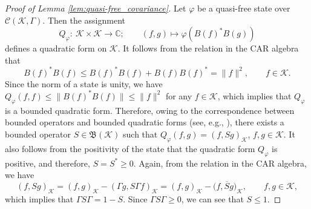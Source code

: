 \documentclass[11pt]{article}
\numberwithin{equation}{section}
\numberwithin{equation}{section}
\newcommand{\mfrak}[1]{\mathfrak{#1}}
\newcommand{\mcal}[1]{\mathcal{#1}}
\newcommand{\mbb}[1]{\mathbb{#1}}
\begin{document}
\begin{proof}[Proof of Lemma \ref{lem:quasi-free_covariance}]
Let $\varphi$ be a quasi-free state over $\mcal{C}(\mcal{K},\Gamma)$.
Then the assignment
\begin{equation*}
	Q_{\varphi}\colon \ \mcal{K}\times \mcal{K}\to\mbb{C};\qquad (f,g)\mapsto \varphi (B(f)^{\ast}B(g))
\end{equation*}
defines a quadratic form on $\mcal{K}$.
It follows from the relation in the CAR algebra that
\begin{equation*}
	B(f)^{\ast}B(f)\le B(f)^{\ast}B(f)+B(f)B(f)^{\ast}=\|f\|^{2},\qquad f\in\mcal{K}.
\end{equation*}
Since the norm of a state is unity, we have $Q_{\varphi}(f,f)\le \|B(f)^{\ast}B(f)\|\le \|f\|^{2}$ for any $f\in\mcal{K}$, which implies that $Q_{\varphi}$ is a bounded quadratic form. Therefore, owing to the correspondence between bounded operators and bounded quadratic forms (see, e.g., \cite[Chapter~1]{Koshmanenko1999}), there exists a bounded operator $S\in \mfrak{B}(\mcal{K})$ such that $Q_{\varphi}(f,g)=(f,Sg)_{\mcal{K}}$, $f,g \in \mcal{K}$. It also follows from the positivity of the state that the quadratic form $Q_{\varphi}$ is positive, and therefore, $S=S^{\ast}\ge 0$. Again, from the relation in the CAR algebra, we have
\begin{equation*}
	(f,Sg)_{\mcal{K}}=(f,g)_{\mcal{K}}-(\Gamma g, S\Gamma f)_{\mcal{K}}=(f,g)_{\mcal{K}}-\big(f,\overline{S} g\big)_{\mcal{K}},\qquad f,g\in\mcal{K},
\end{equation*}
which implies that $\Gamma S \Gamma=1-S$. Since $\Gamma S \Gamma\ge 0$, we can see that $S\le 1$.


\end{proof}
\end{document}
